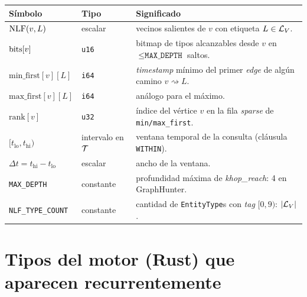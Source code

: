 \begin{center}
\renewcommand{\arraystretch}{1.3}
\begin{longtable}{p{3.4cm}p{2.5cm}p{7.6cm}}
\toprule
\textbf{Símbolo} & \textbf{Tipo} & \textbf{Significado} \\
\midrule
\(\mathrm{NLF}(v, L)\)                                & escalar             & vecinos salientes de \(v\) con etiqueta \(L \in \mathcal{L}_V\). \\
\(\mathrm{bits}[v]\)                                  & \texttt{u16}        & bitmap de tipos alcanzables desde \(v\) en \(\leq \texttt{MAX\_DEPTH}\) saltos. \\
\(\mathrm{min\_first}[v][L]\)                 & \texttt{i64}        & \emph{timestamp} mínimo del primer \emph{edge} de algún camino \(v \rightsquigarrow L\). \\
\(\mathrm{max\_first}[v][L]\)                 & \texttt{i64}        & análogo para el máximo. \\
\(\mathrm{rank}[v]\)                          & \texttt{u32}        & índice del vértice \(v\) en la fila \emph{sparse} de \texttt{min/max\_first}. \\
\([t_{\mathrm{lo}}, t_{\mathrm{hi}})\)        & intervalo en \(\mathcal{T}\) & ventana temporal de la consulta (cláusula \texttt{WITHIN}). \\
\(\Delta t = t_{\mathrm{hi}} - t_{\mathrm{lo}}\) & escalar          & ancho de la ventana. \\
\texttt{MAX\_DEPTH}                           & constante           & profundidad máxima de \emph{khop\_reach}: 4 en GraphHunter. \\
\texttt{NLF\_TYPE\_COUNT}                     & constante           & cantidad de \texttt{EntityType}s con \emph{tag} \([0, 9)\): \(|\mathcal{L}_V|\). \\
\bottomrule
\end{longtable}
\end{center}

\section{Tipos del motor (Rust) que aparecen recurrentemente}

